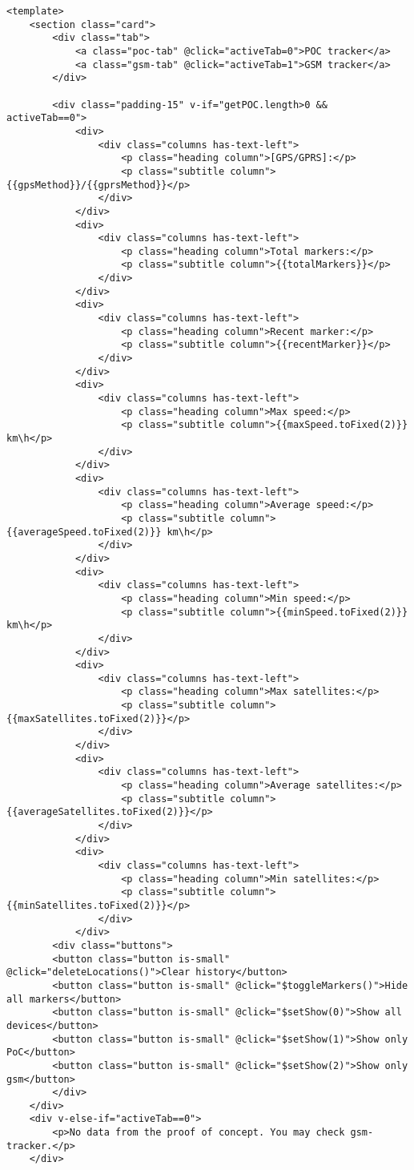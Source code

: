\begin{lstlisting}
<template>
	<section class="card">
		<div class="tab">
			<a class="poc-tab" @click="activeTab=0">POC tracker</a>
			<a class="gsm-tab" @click="activeTab=1">GSM tracker</a>
		</div>
	
		<div class="padding-15" v-if="getPOC.length>0 && activeTab==0">
			<div>
				<div class="columns has-text-left">
					<p class="heading column">[GPS/GPRS]:</p>
					<p class="subtitle column">{{gpsMethod}}/{{gprsMethod}}</p>
				</div>
			</div>
			<div>
				<div class="columns has-text-left">
					<p class="heading column">Total markers:</p>
					<p class="subtitle column">{{totalMarkers}}</p>
				</div>
			</div>
			<div>
				<div class="columns has-text-left">
					<p class="heading column">Recent marker:</p>
					<p class="subtitle column">{{recentMarker}}</p>
				</div>
			</div>
			<div>
				<div class="columns has-text-left">
					<p class="heading column">Max speed:</p>
					<p class="subtitle column">{{maxSpeed.toFixed(2)}} km\h</p>
				</div>
			</div>
			<div>
				<div class="columns has-text-left">
					<p class="heading column">Average speed:</p>
					<p class="subtitle column">{{averageSpeed.toFixed(2)}} km\h</p>
				</div>
			</div>
			<div>
				<div class="columns has-text-left">
					<p class="heading column">Min speed:</p>
					<p class="subtitle column">{{minSpeed.toFixed(2)}} km\h</p>
				</div>
			</div>
			<div>
				<div class="columns has-text-left">
					<p class="heading column">Max satellites:</p>
					<p class="subtitle column">{{maxSatellites.toFixed(2)}}</p>
				</div>
			</div>
			<div>
				<div class="columns has-text-left">
					<p class="heading column">Average satellites:</p>
					<p class="subtitle column">{{averageSatellites.toFixed(2)}}</p>
				</div>
			</div>
			<div>
				<div class="columns has-text-left">
					<p class="heading column">Min satellites:</p>
					<p class="subtitle column">{{minSatellites.toFixed(2)}}</p>
				</div>
			</div>
		<div class="buttons">
		<button class="button is-small" @click="deleteLocations()">Clear history</button>
		<button class="button is-small" @click="$toggleMarkers()">Hide all markers</button>
		<button class="button is-small" @click="$setShow(0)">Show all devices</button>
		<button class="button is-small" @click="$setShow(1)">Show only PoC</button>
		<button class="button is-small" @click="$setShow(2)">Show only gsm</button>
		</div>
	</div>
	<div v-else-if="activeTab==0">
		<p>No data from the proof of concept. You may check gsm-tracker.</p>
	</div>
	

\end{lstlisting}

